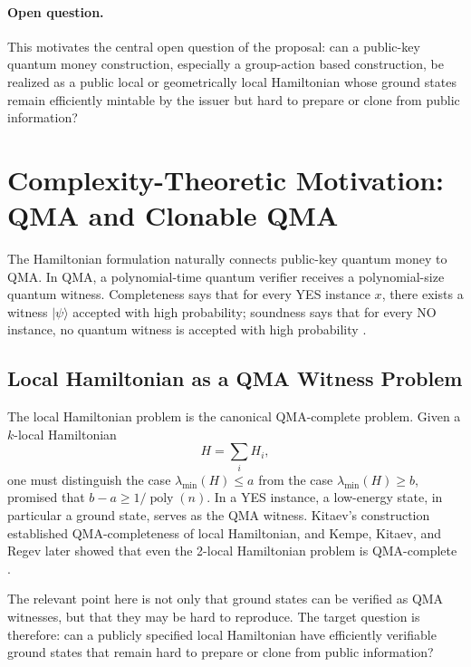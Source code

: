 \documentclass[12pt]{article}
\begin{document}
\paragraph{Open question.}
This motivates the central open question of the proposal: can a public-key quantum money construction, especially a group-action based construction, be realized as a public local or geometrically local Hamiltonian whose ground states remain efficiently mintable by the issuer but hard to prepare or clone from public information?

\section{Complexity-Theoretic Motivation: QMA and Clonable QMA}

The Hamiltonian formulation naturally connects public-key quantum money to QMA. In QMA, a polynomial-time quantum verifier receives a polynomial-size quantum witness. Completeness says that for every YES instance $x$, there exists a witness $|\psi\rangle$ accepted with high probability; soundness says that for every NO instance, no quantum witness is accepted with high probability \cite{aharonovQuantumNPSurvey2002}.

\subsection{Local Hamiltonian as a QMA Witness Problem}
The local Hamiltonian problem is the canonical QMA-complete problem. Given a $k$-local Hamiltonian
\[
H=\sum_i H_i,
\]
one must distinguish the case $\lambda_{\min}(H)\le a$ from the case $\lambda_{\min}(H)\ge b$, promised that $b-a\ge 1/\operatorname{poly}(n)$. In a YES instance, a low-energy state, in particular a ground state, serves as the QMA witness. Kitaev's construction established QMA-completeness of local Hamiltonian, and Kempe, Kitaev, and Regev later showed that even the 2-local Hamiltonian problem is QMA-complete \cite{aharonovQuantumNPSurvey2002,kempeComplexityLocalHamiltonian2006}.

The relevant point here is not only that ground states can be verified as QMA witnesses, but that they may be hard to reproduce. The target question is therefore: can a publicly specified local Hamiltonian have efficiently verifiable ground states that remain hard to prepare or clone from public information?
\end{document}
